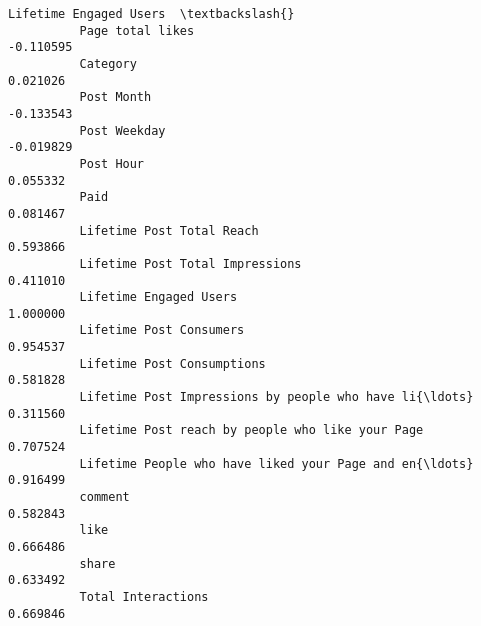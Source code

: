 \documentclass[11pt]{article}
\begin{document}
\begin{Verbatim}[commandchars=\\\{\}]
                                                              Lifetime Engaged Users  \textbackslash{}
          Page total likes                                                 -0.110595   
          Category                                                          0.021026   
          Post Month                                                       -0.133543   
          Post Weekday                                                     -0.019829   
          Post Hour                                                         0.055332   
          Paid                                                              0.081467   
          Lifetime Post Total Reach                                         0.593866   
          Lifetime Post Total Impressions                                   0.411010   
          Lifetime Engaged Users                                            1.000000   
          Lifetime Post Consumers                                           0.954537   
          Lifetime Post Consumptions                                        0.581828   
          Lifetime Post Impressions by people who have li{\ldots}                0.311560   
          Lifetime Post reach by people who like your Page                  0.707524   
          Lifetime People who have liked your Page and en{\ldots}                0.916499   
          comment                                                           0.582843   
          like                                                              0.666486   
          share                                                             0.633492   
          Total Interactions                                                0.669846   
          

\end{Verbatim}
\end{document}

